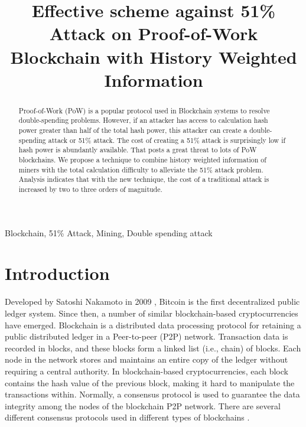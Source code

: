 \documentclass[conference]{IEEEtran}
\begin{document}
\title{Effective scheme against 51\% Attack on Proof-of-Work Blockchain with History Weighted Information\\
}

\author{
}

\maketitle

\begin{abstract}
Proof-of-Work (PoW) is a popular protocol used in Blockchain systems to resolve double-spending problems. However, if an attacker has access to calculation hash power greater than half of the total hash power, this attacker can create a double-spending attack or 51\% attack. The cost of creating a 51\% attack is surprisingly low if hash power is abundantly available. That posts a great threat to lots of PoW blockchains. We propose a technique to combine history weighted information of miners with the total calculation difficulty to alleviate the 51\% attack problem. Analysis indicates that with the new technique, the cost of a traditional attack is increased by two to three orders of magnitude.
\end{abstract}


\begin{IEEEkeywords}
Blockchain, 51\% Attack, Mining, Double spending attack
\end{IEEEkeywords}

\section{Introduction}
Developed by Satoshi Nakamoto in 2009 \cite{b1}, Bitcoin is the first decentralized public ledger system. Since then, a number of similar blockchain-based cryptocurrencies have emerged. Blockchain is a distributed data processing protocol for retaining a public distributed ledger in a Peer-to-peer (P2P) network. Transaction data is recorded in blocks, and these blocks form a linked list (i.e., chain) of blocks. Each node in the network stores and maintains an entire copy of the ledger without requiring a central authority. In blockchain-based cryptocurrencies, each block contains the hash value of the previous block, making it hard to manipulate the transactions within. Normally, a consensus protocol is used to guarantee the data integrity among the nodes of the blockchain P2P network. There are several different consensus protocols used in different types of blockchains \cite{b2}.
\end{document}
